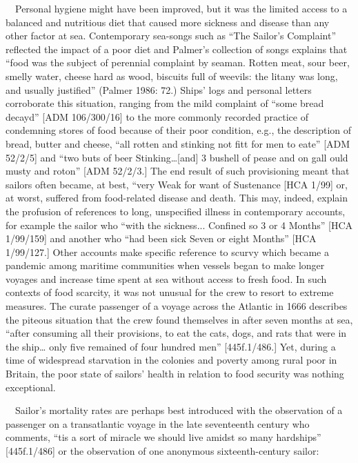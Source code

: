 \documentclass[12pt]{article}
\newenvironment{styleStandard}{\renewcommand\baselinestretch{1.0}\setlength\leftskip{0cm}\setlength\rightskip{0cm plus 1fil}\setlength\parindent{0cm}\setlength\parfillskip{0pt plus 1fil}\setlength\parskip{0in plus 1pt}\writerlistparindent\writerlistleftskip\leavevmode\normalfont\normalsize\writerlistlabel\ignorespaces}{\unskip\vspace{0in plus 1pt}\par}
\newcommand\writerlistleftskip{}
\newcommand\writerlistparindent{}
\newcommand\writerlistlabel{}
\begin{document}
\begin{styleStandard}
\ \ Personal hygiene might have been improved, but it was the limited access to a balanced and nutritious diet that caused more sickness and disease than any other factor at sea. Contemporary sea-songs such as “The Sailor’s Complaint” reflected the impact of a poor diet and Palmer’s collection of songs explains that “food was the subject of perennial complaint by seaman. Rotten meat, sour beer, smelly water, cheese hard as wood, biscuits full of weevils: the litany was long, and usually justified” (Palmer 1986: 72.) Ships’ logs and personal letters corroborate this situation, ranging from the mild complaint of “some bread decay{\textquotesingle}d” [ADM 106/300/16] to the more commonly recorded practice of condemning stores of food because of their poor condition, e.g., the description of bread, butter and cheese, “all rotten and stinking not fitt for men to eate” [ADM 52/2/5] and “two buts of beer Stinking…[and] 3 bushell of pease and on gall ould musty and roton” [ADM 52/2/3.] The end result of such provisioning meant that sailors often became, at best, “very Weak for want of Sustenance{\textquotedbl} [HCA 1/99] or, at worst, suffered from food-related disease and death. This may, indeed, explain the profusion of references to long, unspecified illness in contemporary accounts, for example the sailor who “with the sickness... Confined so 3 or 4 Months” [HCA 1/99/159] and another who “had been sick Seven or eight Months” [HCA 1/99/127.] Other accounts make specific reference to scurvy which became a pandemic among maritime communities when vessels began to make longer voyages and increase time spent at sea without access to fresh food. In such contexts of food scarcity, it was not unusual for the crew to resort to extreme measures. The curate passenger of a voyage across the Atlantic in 1666 describes the piteous situation that the crew found themselves in after seven months at sea, “after consuming all their provisions, to eat the cats, dogs, and rats that were in the ship… only five remained of four hundred men” [445f.1/486.] Yet, during a time of widespread starvation in the colonies and poverty among rural poor in Britain, the poor state of sailors’ health in relation to food security was nothing exceptional. 
\end{styleStandard}


\begin{styleStandard}
\ \ Sailor’s mortality rates are perhaps best introduced with the observation of a passenger on a transatlantic voyage in the late seventeenth century who comments, “tis a sort of miracle we should live amidst so many hardships” [445f.1/486] or the observation of one anonymous sixteenth-century sailor:
\end{styleStandard}
\end{document}
